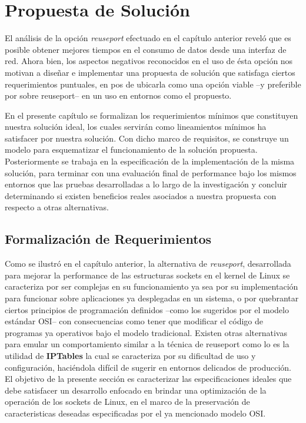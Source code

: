 \chapter{Propuesta de Solución}
El análisis de la opción \emph{reuseport} efectuado en el capítulo anterior reveló que es posible obtener mejores tiempos en el consumo de datos desde una interfaz de red. Ahora bien, los aspectos negativos reconocidos en el uso de ésta opción nos motivan a diseñar e implementar una propuesta de solución que satisfaga ciertos requerimientos puntuales, en pos de ubicarla como una opción viable --y preferible por sobre reuseport-- en un uso en entornos como el propuesto.

En el presente capítulo se formalizan los requerimientos mínimos que constituyen nuestra solución ideal, los cuales servirán como lineamientos mínimos ha satisfacer por nuestra solución. Con dicho marco de requisitos, se construye un modelo para esquematizar el funcionamiento de la solución propuesta. Posteriormente se trabaja en la especificación de la implementación de la misma solución, para terminar con una evaluación final de performance bajo los mismos entornos que las pruebas desarrolladas a lo largo de la investigación y concluir determinando si existen beneficios reales asociados a nuestra propuesta con respecto a otras alternativas.

\section{Formalización de Requerimientos}
Como se ilustró en el capítulo anterior, la alternativa de \emph{reuseport}, desarrollada para mejorar la performance de las estructuras sockets en el kernel de Linux se caracteriza por ser complejas en su funcionamiento ya sea por su implementación para funcionar sobre aplicaciones ya desplegadas en un sistema, o por quebrantar ciertos principios de programación definidos --como los sugeridos por el modelo estándar OSI-- con consecuencias como tener que modificar el código de programas ya operativos bajo el modelo tradicional. Existen otras alternativas para emular un comportamiento similar a la técnica de reuseport como lo es la utilidad de \textbf{IPTables} \cite{book:iptables} la cual se caracteriza por su dificultad de uso y configuración, haciéndola difícil de sugerir en entornos delicados de producción. El objetivo de la presente sección es caracterizar las especificaciones ideales que debe satisfacer un desarrollo enfocado en brindar una optimización de la operación de los sockets de Linux, en el marco de la preservación de caracteristicas deseadas especificadas por el ya mencionado modelo OSI.

